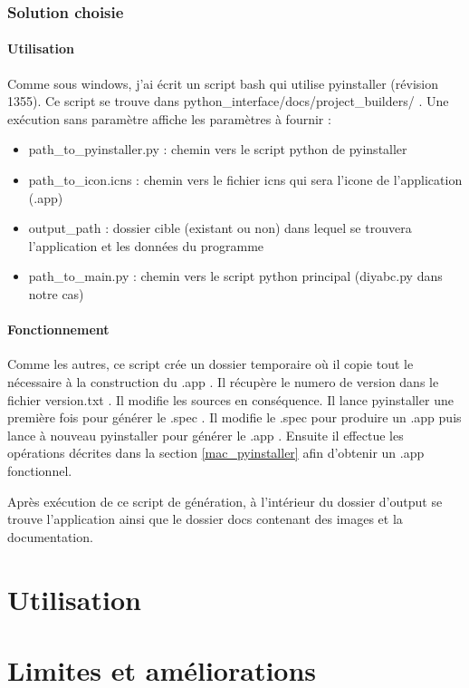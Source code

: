 \documentclass[12pt,a4paper]{article}
\begin{document}
        \subsubsection{Solution choisie}
        \paragraph{Utilisation}

        Comme sous windows, j'ai écrit un script bash qui utilise pyinstaller
        (révision 1355). Ce script se trouve dans
        python\_interface/docs/project\_builders/ .  Une exécution sans
        paramètre affiche les paramètres à fournir : \\

        \begin{itemize}
            \item path\_to\_pyinstaller.py : chemin vers le script python de pyinstaller
            \item path\_to\_icon.icns : chemin vers le fichier icns qui sera l'icone de l'application (.app)
            \item output\_path : dossier cible (existant ou non) dans lequel se trouvera l'application et les données du programme
            \item path\_to\_main.py : chemin vers le script python principal (diyabc.py dans notre cas)\\
        \end{itemize}

        \paragraph{Fonctionnement}

        Comme les autres, ce script crée un dossier temporaire où il copie tout
        le nécessaire à la construction du .app .  Il récupère le numero de
        version dans le fichier version.txt . Il modifie les sources en
        conséquence. Il lance pyinstaller une première fois pour générer le
        .spec . Il modifie le .spec pour produire un .app puis lance à nouveau
        pyinstaller pour générer le .app .  Ensuite il effectue les opérations
        décrites dans la section \ref{mac_pyinstaller} afin d'obtenir un .app
        fonctionnel.

        Après exécution de ce script de génération, à l'intérieur du dossier
        d'output se trouve l'application ainsi que le dossier docs contenant des
        images et la documentation.


\section{Utilisation}

\section{Limites et améliorations}
\end{document}
